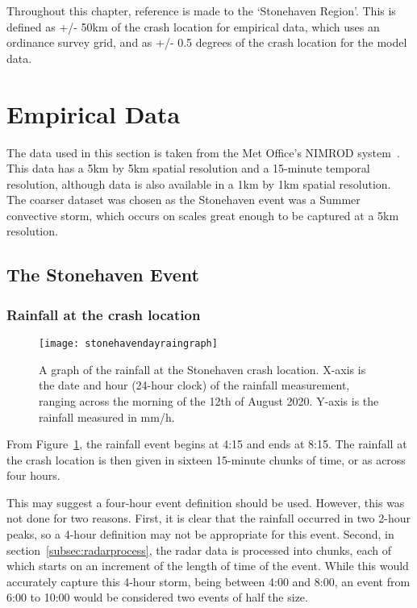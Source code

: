 
Throughout this chapter,
    reference is made to the `Stonehaven Region'.
This is defined as +/- 50km of the crash location for empirical data,
    which uses an ordinance survey grid,
    and as +/- 0.5 degrees of the crash location for the model data.

\section{Empirical Data}\label{sec:def}

The data used in this section is taken from the Met Office's NIMROD system~\cite{radar_data}.
This data has a 5km by 5km spatial resolution and a 15-minute temporal resolution,
    although data is also available in a 1km by 1km spatial resolution.
The coarser dataset was chosen as the Stonehaven event was a Summer convective storm,
    which occurs on scales great enough to be captured at a 5km resolution.

\subsection{The Stonehaven Event}\label{subsec:actualevent}

\subsubsection{Rainfall at the crash location}

\begin{figure}[H]
    \begin{center}
    \texttt{[image: stonehavendayraingraph]}
    \end{center}
    \caption[A graph of the rainfall at the Stonehaven crash location.]{
        A graph of the rainfall at the Stonehaven crash location.
    X-axis is the date and hour (24-hour clock) of the rainfall measurement,
        ranging across the morning of the 12th of August 2020.
    Y-axis is the rainfall measured in mm/h.}
    \label{fig:stonehavendayraingraph}
\end{figure}

From Figure~\ref{fig:stonehavendayraingraph},
    the rainfall event begins at 4:15 and ends at 8:15.
The rainfall at the crash location is then given in sixteen 15-minute chunks of time,
    or as across four hours.

This may suggest a four-hour event definition should be used.
However, this was not done for two reasons.
First, it is clear that the rainfall occurred in two 2-hour peaks,
 so a 4-hour definition may not be appropriate for this event.
Second, in section~\ref{subsec:radarprocess},
    the radar data is processed into chunks,
    each of which starts on an increment of the length of time of the event.
While this would accurately capture this 4-hour storm, being between 4:00 and 8:00,
    an event from 6:00 to 10:00 would be considered two events of half the size.

